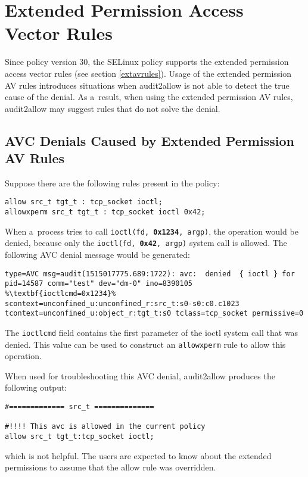 \section{Extended Permission Access Vector Rules}
Since policy version 30, the SELinux policy supports the extended permission
access vector rules (see section \ref{extavrules}). Usage of the extended
permission AV rules introduces situations when audit2allow is not able to detect
the true cause of the denial. As a~result, when using the extended permission AV
rules, audit2allow may suggest rules that do not solve the denial.

\subsection{AVC Denials Caused by Extended Permission AV Rules}
Suppose there are the following rules present in the policy:
\begin{lstlisting}
allow src_t tgt_t : tcp_socket ioctl;
allowxperm src_t tgt_t : tcp_socket ioctl 0x42;
\end{lstlisting}
When a~process tries to call \texttt{ioctl(fd, \textbf{0x1234}, argp)}, the
operation would be denied, because only the \texttt{ioctl(fd, \textbf{0x42},
argp)} system call is allowed. The following AVC denial message would be
generated:
\begin{lstlisting}[escapechar=\%]
type=AVC msg=audit(1515017775.689:1722): avc:  denied  { ioctl } for
pid=14587 comm="test" dev="dm-0" ino=8390105 %\textbf{ioctlcmd=0x1234}%
scontext=unconfined_u:unconfined_r:src_t:s0-s0:c0.c1023
tcontext=unconfined_u:object_r:tgt_t:s0 tclass=tcp_socket permissive=0
\end{lstlisting}
The \texttt{ioctlcmd} field contains the first parameter of the ioctl system
call that was denied. This value can be used to construct an \texttt{allowxperm}
rule to allow this operation.

When used for troubleshooting this AVC denial, audit2allow produces the
following output:
\begin{lstlisting}
#============= src_t ==============

#!!!! This avc is allowed in the current policy
allow src_t tgt_t:tcp_socket ioctl;
\end{lstlisting}
which is not helpful. The users are expected to know about the extended
permissions to assume that the allow rule was overridden.

